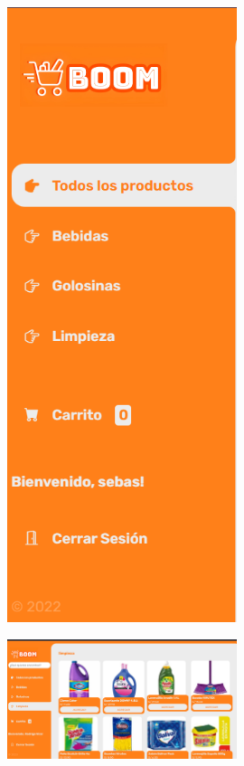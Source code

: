 \documentclass{article}
\begin{document}
	\begin{figure}[H]
		\centering
		\includegraphics[width=0.6\textwidth,keepaspectratio]{img/7.png}
	\end{figure}
	\begin{figure}[H]
		\centering
		\includegraphics[width=0.6\textwidth,keepaspectratio]{img/8.png}
	\end{figure}
\end{document}
